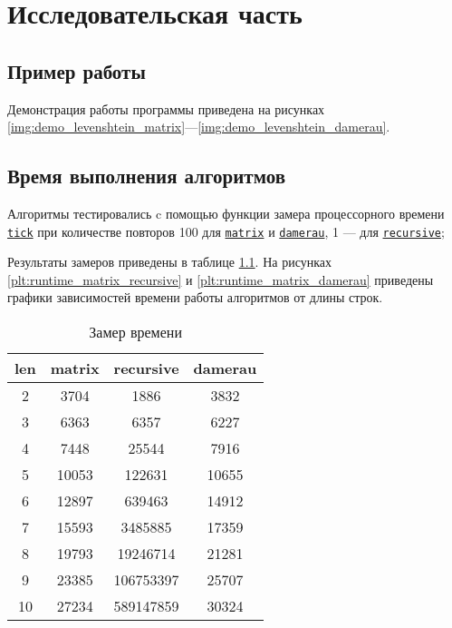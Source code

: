 \chapter{Исследовательская часть}

\section{Пример работы}

Демонстрация работы программы приведена на рисунках \ref{img:demo_levenshtein_matrix}---\ref{img:demo_levenshtein_damerau}.


\section{Время выполнения алгоритмов}

Алгоритмы тестировались c помощью функции замера процессорного времени \hyperref[lst:tick]{\texttt{tick}} при количестве повторов 100 для \hyperref[lst:levenshtein_matrix]{\texttt{matrix}} и \hyperref[lst:levenshtein_damerau]{\texttt{damerau}}, 1 — для \hyperref[lst:levenshtein_recursive]{\texttt{recursive}};

Результаты замеров приведены в таблице \ref{tbl:runtime}.
На рисунках \ref{plt:runtime_matrix_recursive} и \ref{plt:runtime_matrix_damerau} приведены графики зависимостей времени работы алгоритмов от длины строк.

\begin{table}
	\begin{center}
		\begin{tabular}{|c|c|c|c|}
			\hline
			len&         matrix&      recursive&        damerau\\
			\hline
			  2&           3704&           1886&           3832\\
			\hline
			  3&           6363&           6357&           6227\\
			\hline  
			  4&           7448&          25544&           7916\\
			\hline
			  5&          10053&         122631&          10655\\
			\hline
			  6&          12897&         639463&          14912\\
			\hline
			  7&          15593&        3485885&          17359\\
			\hline
			  8&          19793&       19246714&          21281\\
			\hline
			  9&          23385&      106753397&          25707\\
			\hline
			 10&          27234&      589147859&          30324\\
			\hline
		\end{tabular}
	\end{center}
	\caption{Замер времени}
	\label{tbl:runtime}
\end{table}

